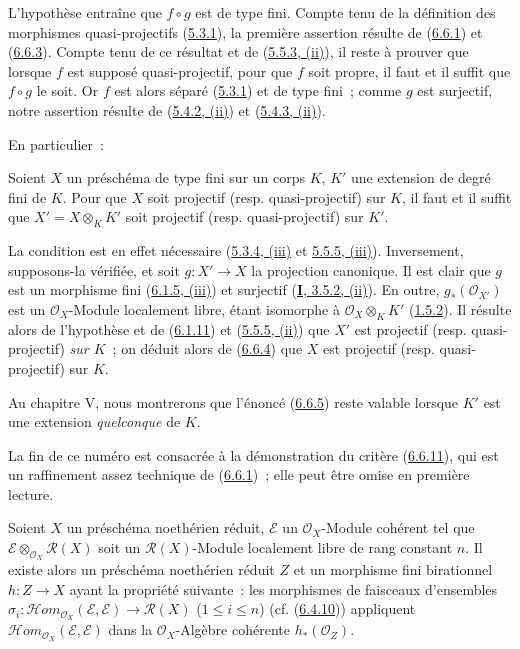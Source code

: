 L'hypothèse entraîne que $f\circ g$ est de type fini. Compte tenu de la
définition des morphismes quasi-projectifs
(\hyperref[II.5.3.1-fr]{5.3.1}), la première assertion résulte de
(\hyperref[II.6.6.1-fr]{6.6.1}) et
(\hyperref[II.6.6.3-fr]{6.6.3}). Compte tenu de ce résultat et de
(\hyperref[II.5.5.3-fr]{5.5.3, (ii)}), il reste à prouver que lorsque $f$ est
supposé quasi-projectif, pour que $f$ soit propre, il faut et il suffit que
$f\circ g$ le soit. Or $f$ est alors séparé
(\hyperref[II.5.3.1-fr]{5.3.1}) et de type fini~; comme $g$ est surjectif,
notre assertion résulte de (\hyperref[II.5.4.2-fr]{5.4.2, (ii)}) et
(\hyperref[II.5.4.3-fr]{5.4.3, (ii)}).

En particulier~:

\begin{corollary}[6.6.5]
\label{II.6.6.5-fr}
Soient $X$ un préschéma de type fini sur un corps $K$, $K'$ une extension de
degré fini de $K$. Pour que $X$ soit projectif \textup{(resp.} quasi-projectif\textup{)} sur
$K$, il faut et il suffit que $X'=X\otimes_K K'$ soit projectif \textup{(resp.}
quasi-projectif\textup{)} sur $K'$.
\end{corollary}

La condition est en effet nécessaire
(\hyperref[II.5.3.4-fr]{5.3.4, (iii)} et
\hyperref[II.5.5.5-fr]{5.5.5, (iii)}). Inversement, supposons-la vérifiée,
et soit $g:X'\to X$ la projection canonique. Il est clair que $g$ est un
morphisme fini (\hyperref[II.6.1.5-fr]{6.1.5, (iii)}) et surjectif
(\hyperref[I.3.5.2-fr]{\textbf{I}, 3.5.2, (ii)}). En outre,
$g_*(\mathcal{O}_{X'})$ est un $\mathcal{O}_X$-Module localement libre, étant
isomorphe à $\mathcal{O}_X\otimes_K K'$
(\hyperref[II.1.5.2-fr]{1.5.2}). Il résulte alors de l'hypothèse et de
(\hyperref[II.6.1.11-fr]{6.1.11}) et
(\hyperref[II.5.5.5-fr]{5.5.5, (ii)}) que $X'$ est projectif (resp.
quasi-projectif) \emph{sur $K$}~; on déduit alors de
(\hyperref[II.6.6.4-fr]{6.6.4}) que $X$ est projectif (resp.
quasi-projectif) sur $K$.

Au chapitre V, nous montrerons que l'énoncé
(\hyperref[II.6.6.5-fr]{6.6.5}) reste valable lorsque $K'$ est une extension
\emph{quelconque} de $K$.

La fin de ce numéro est consacrée à la démonstration du critère
(\hyperref[II.6.6.11-fr]{6.6.11}), qui est un raffinement assez technique de
(\hyperref[II.6.6.1-fr]{6.6.1})~; elle peut être omise en première lecture.

\begin{lemma}[6.6.6]
\label{II.6.6.6-fr}
Soient $X$ un préschéma noethérien réduit, $\mathcal{E}$ un
$\mathcal{O}_X$-Module cohérent tel que
$\mathcal{E}\otimes_{\mathcal{O}_X}\mathcal{R}(X)$ soit un
$\mathcal{R}(X)$-Module localement libre de rang constant $n$. Il existe
alors un préschéma noethérien réduit $Z$ et un morphisme fini birationnel
$h:Z\to X$ ayant la propriété suivante~: les morphismes de faisceaux
d'ensembles
$\sigma_i:\mathcal{H}om_{\mathcal{O}_X}(\mathcal{E},\mathcal{E})
\to\mathcal{R}(X)$ \textup{($1\leq i\leq n$)}
\textup{(cf. (\hyperref[II.6.4.10-fr]{6.4.10}))} appliquent
$\mathcal{H}om_{\mathcal{O}_X}(\mathcal{E},\mathcal{E})$ dans la
$\mathcal{O}_X$-Algèbre cohérente $h_*(\mathcal{O}_Z)$.
\end{lemma}


